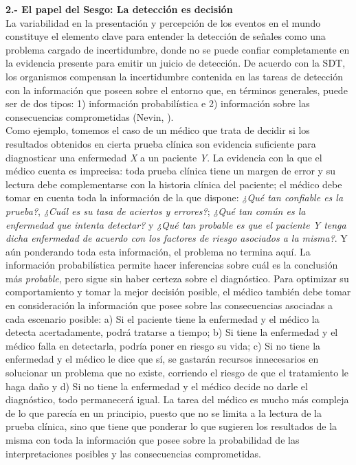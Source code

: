   \textbf{2.- El papel del Sesgo: La detección es decisión}\\

La variabilidad en la presentación y percepción de los eventos en el mundo constituye el elemento clave para entender la detección de señales como una problema cargado de incertidumbre, donde no se puede confiar completamente en la evidencia presente para emitir un juicio de detección. De acuerdo con la SDT, los organismos compensan la incertidumbre contenida en las tareas de detección con la información que poseen sobre el entorno que, en términos generales, puede ser de dos tipos: 1) información probabilística e 2) información sobre las consecuencias comprometidas (Nevin, \citeyear{Nevin1969}).\\

Como ejemplo, tomemos el caso de un médico que trata de decidir si los resultados obtenidos en cierta prueba clínica son evidencia suficiente para diagnosticar una enfermedad \textit{X} a un paciente \textit{Y}. La evidencia con la que el médico cuenta es imprecisa: toda prueba clínica tiene un margen de error y su lectura debe complementarse con la historia clínica del paciente; el médico debe tomar en cuenta toda la información de la que dispone: \textit{¿Qué tan confiable es la prueba?}, \textit{¿Cuál es su tasa de aciertos y errores?}; \textit{¿Qué tan común es la enfermedad que intenta detectar?} y \textit{¿Qué tan probable es que el paciente Y tenga dicha enfermedad de acuerdo con los factores de riesgo asociados a la misma?}. Y aún ponderando toda esta información, el problema no termina aquí. La información probabilística permite hacer inferencias sobre cuál es la conclusión más \textit{probable}, pero sigue sin haber certeza sobre el diagnóstico. Para optimizar su comportamiento y tomar la mejor decisión posible, el médico también debe tomar en consideración la información que posee sobre las consecuencias asociadas a cada escenario posible: a) Si el paciente tiene la enfermedad y el médico la detecta acertadamente, podrá tratarse a tiempo; b) Si tiene la enfermedad y el médico falla en detectarla, podría poner en riesgo su vida; c) Si no tiene la enfermedad y el médico le dice que sí, se gastarán recursos innecesarios en solucionar un problema que no existe, corriendo el riesgo de que el tratamiento le haga daño y d) Si no tiene la enfermedad y el médico decide no darle el diagnóstico, todo permanecerá igual. La tarea del médico es mucho más compleja de lo que parecía en un principio, puesto que no se limita a la lectura de la prueba clínica, sino que tiene que ponderar lo que sugieren los resultados de la misma con toda la información que posee sobre la probabilidad de las interpretaciones posibles y las consecuencias comprometidas.\\

